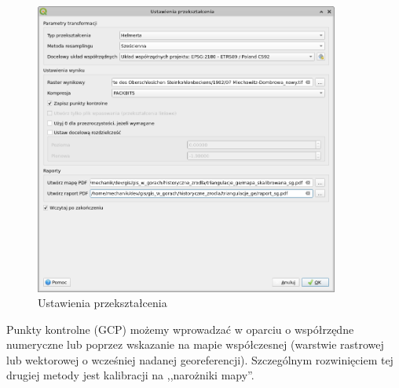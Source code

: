 \documentclass[a4paper,11pt, onecolumn, openany]{memoir}
\begin{document}
			\begin{figure}[!ht]
			\centering
			\includegraphics[width=10cm]{georef-ustawienia}
			\caption{Ustawienia przekształcenia}
		\end{figure}
Punkty kontrolne (GCP) możemy wprowadzać w oparciu o współrzędne numeryczne lub poprzez wskazanie na mapie współczesnej (warstwie rastrowej lub wektorowej o wcześniej nadanej georeferencji). Szczególnym rozwinięciem tej drugiej metody jest kalibracji na ,,narożniki mapy''.
\end{document}
